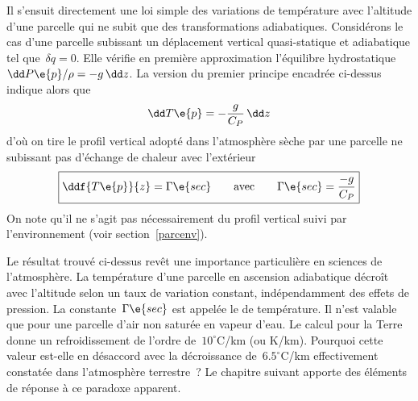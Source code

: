 \sk
Il s'ensuit directement une loi simple des variations de température avec l'altitude d'une parcelle qui ne subit que des transformations adiabatiques. Considérons le cas d'une parcelle subissant un déplacement vertical quasi-statique et adiabatique tel que~$\delta q = 0$. Elle vérifie en première approximation l'équilibre hydrostatique~$\dd P\e{p} / \rho = - g \, \dd z$. La version du premier principe encadrée ci-dessus indique alors que
\[  \dd T\e{p}  = - \frac{g}{C_P} \, \dd z \]
d'où on tire le profil vertical adopté dans l'atmosphère sèche par une parcelle ne subissant pas d'échange de chaleur avec l'extérieur
\[  \boxed{ \ddf{T\e{p}}{z}  = \Gamma\e{sec} \qquad \text{avec} \qquad \Gamma\e{sec} = \frac{-g}{C_P} } \]
On note qu'il ne s'agit pas nécessairement du profil vertical suivi par l'environnement (voir section~\ref{parcenv}).

\sk
Le résultat trouvé ci-dessus revêt une importance particulière en sciences de l'atmosphère. La température d'une parcelle en ascension adiabatique décroît avec l'altitude selon un taux de variation constant, indépendamment des effets de pression. La constante~$\Gamma\e{sec}$ est appelée le  de température. Il n'est valable que pour une parcelle d'air non saturée en vapeur d'eau. Le calcul pour la Terre donne un refroidissement de l'ordre de~$10^{\circ}$C/km (ou K/km). Pourquoi cette valeur est-elle en désaccord avec la décroissance de~$6.5^{\circ}$C/km effectivement constatée dans l'atmosphère terrestre~? Le chapitre suivant apporte des éléments de réponse à ce paradoxe apparent.





